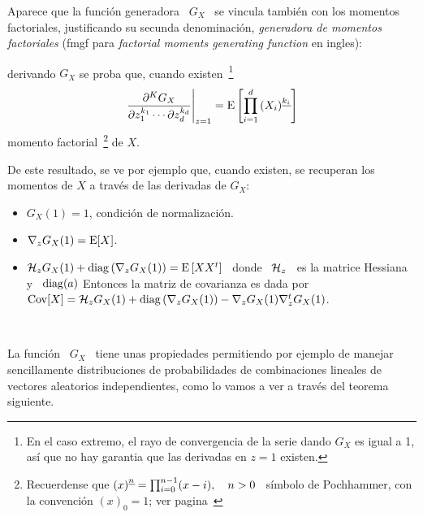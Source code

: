 Aparece  que la  funci\'on generadora  \ $G_X$  \ se  vincula tambi\'en  con los
momentos factoriales, justificando su secunda denominaci\'on, {\em generadora de
  momentos factoriales}  (fmgf para {\em factorial  moments generating function}
en ingles):
%
\begin{lema}
\label{Lem:MP:GeneracionMomentosFactoriales}
%
 derivando $G_X$ se proba que, cuando
  existen~\footnote{En el  caso extremo,  el rayo de  convergencia de  la serie
    dando $G_X$ es igual a 1, as\'i  que no hay garantia que las derivadas en $z
    = 1$ existen.}
  \[
  \left.\frac{\partial^K     G_X}{\partial     z_1^{k_1}     \cdots     \partial
      z_d^{k_d}}\right|_{z=1} = \operatorname{E}\left[ \prod_{i=1}^d \left(X_i\right)^{\underline{k_i}} \right]
  \]
  momento factorial~\footnote{Recuerdense que  $\left(x\right)^{\underline{n}} = \prod_{i=0}^{n-1} (x-i),
    \quad n > 0$ \ s\'imbolo de Pochhammer, con la convenci\'on $(x)_0 = 1$; ver
    pagina~\pageref{Foot:MP:Pochhammer}} de $X$.
\end{lema}

De  este resultado,  se ve  por ejemplo  que, cuando  existen, se  recuperan los
momentos de $X$ a trav\'es de las derivadas de $G_X$:
%
\begin{itemize}
\item $G_X(1) = 1$, condici\'on de normalizaci\'on.
%
\item $\nabla_z G_X(1) = \operatorname{E}[X]$.
%
\item $\mathcal{H}_z G_X(1)  + \operatorname{diag}\left( \nabla_z G_X(1) \right)  = \operatorname{E}\left[ X X^t
  \right]$  \  donde  \ $\mathcal{H}_z$  \  es  la  matrice  Hessiana y  \  $\operatorname{diag}(a)$
  Entonces la  matriz de covarianza  es dada por  \ $\operatorname{Cov}[X] = \mathcal{H}_z  G_X(1) +
  \operatorname{diag}\left( \nabla_z G_X(1) \right) - \nabla_z G_X(1) \nabla_z^t G_X(1)$.
\end{itemize}

\

La funci\'on \ $G_X$ \ tiene unas propiedades permitiendo por ejemplo de manejar
sencillamente  distribuciones  de probabilidades  de  combinaciones lineales  de
vectores aleatorios independientes,  como lo vamos a ver  a trav\'es del teorema
siguiente.

